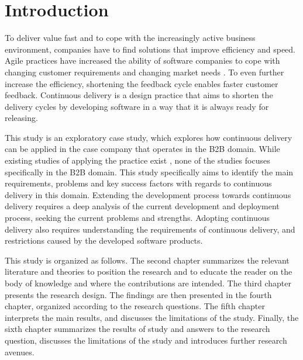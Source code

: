 \documentclass[lnbip]{svmultln}
\begin{document}
\section{Introduction}
To deliver value fast and to cope with the increasingly active business environment, companies have to find solutions that improve efficiency and speed. Agile practices \cite{cockburn2002agile} have increased the ability of software companies to cope with changing customer requirements and changing market needs \cite{dzamashvili2010impact}. To even further increase the efficiency, shortening the feedback cycle enables faster customer feedback. Continuous delivery is a design practice that aims to shorten the delivery cycles by developing software in a way that it is always ready for releasing.

This study is an exploratory case study, which explores how continuous delivery can be applied in the case company that operates in the B2B domain. While existing studies of applying the practice exist \cite{olsson2012climbing, neely2013continuous}, none of the studies focuses specifically in the B2B domain. This study specifically aims to identify the main requirements, problems and key success factors with regards to continuous delivery in this domain. Extending the development process towards continuous delivery requires a deep analysis of the current development and deployment process, seeking the current problems and strengths. Adopting continuous delivery also requires understanding the requirements of continuous delivery, and restrictions caused by the developed software products. 

This study is organized as follows. The second chapter summarizes the relevant literature and theories to position the research and to educate the reader on the body of knowledge and where the contributions are intended. The third chapter presents the research design. The findings are then presented in the fourth chapter, organized according to the research questions. The fifth chapter interprets the main results, and discusses the limitations of the study. Finally, the sixth chapter summarizes the results of study and answers to the research question, discusses the limitations of the study and introduces further research avenues.
\end{document}
